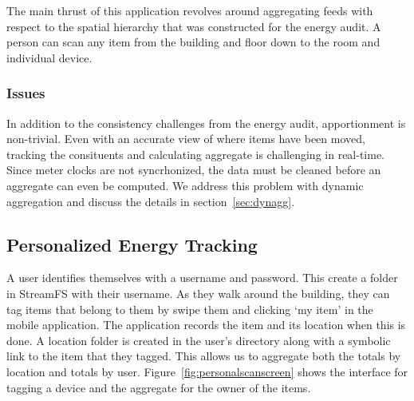 The main thrust of this application revolves around aggregating feeds with respect to the spatial hierarchy that was
constructed for the energy audit.  A person can scan any item from the building and floor down to the room
and individual device.

\subsubsection{Issues}
In addition to the consistency challenges from the energy audit, apportionment is non-trivial.  Even with an accurate
view of where items have been moved, tracking the consituents and calculating aggregate is challenging in real-time.
Since meter clocks are not syncrhonized, the data must be cleaned before an aggregate can even be computed.
We address this problem with dynamic aggregation and discuss the details in section~\ref{sec:dynagg}.

\subsection{Personalized Energy Tracking}
A user identifies themselves with a username and password.  This create a folder in StreamFS with their username.  As they
walk around the building, they can tag items that belong to them by swipe them and clicking `my item' in the mobile
application.  The application records the item and its location when this is done.  A location folder is created
in the user's directory along with a symbolic link to the item that they tagged.  This allows us to aggregate both the totals
by location and totals by user.  Figure~\ref{fig:personalscanscreen} shows the interface for tagging a device 
and the aggregate for the owner of the items.

